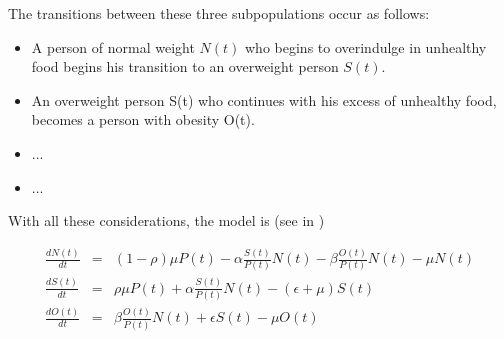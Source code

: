 
	The transitions between these three subpopulations occur as follows:
	\begin{itemize}
		\item A person of normal weight $N(t)$ who begins to overindulge in unhealthy food begins his transition to an overweight person $S(t)$.
		
		\item An overweight person S(t) who continues with his excess of unhealthy food, becomes a person with obesity O(t).
		
		\item ...
		\item ...
	\end{itemize}

	\medskip
	With all these considerations, the model is (see in
	 \cite{th})

	\begin{equation}
		\begin{array}{ccl}
			{\displaystyle \frac{dN(t)}{dt}}&=&(1-\rho)\mu P(t) -\alpha  {\displaystyle\frac{S(t)}{P(t)}}N(t) - \beta {\displaystyle\frac{O(t)}{P(t)}}N(t)-\mu N(t)\\
			{\displaystyle\frac{dS(t)}{dt}}&=&\rho\mu P(t) +\alpha {\displaystyle\frac{S(t)}{P(t)}}N(t)-(\epsilon + \mu) S(t)\\
			{\displaystyle\frac{dO(t)}{dt}}&=& \beta {\displaystyle\frac{O(t)}{P(t)}}N(t)+\epsilon S(t)-\mu O(t)
		\end{array}
		\label{eq:1}
	\end{equation}
	
